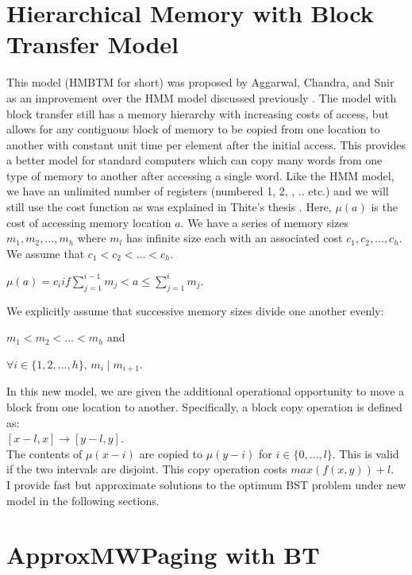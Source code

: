 \documentclass[letterpaper,12pt,titlepage,oneside,final]{book}
\theoremstyle{plain}
\begin{document}
\section{Hierarchical Memory with Block Transfer Model}
This model (HMBTM for short) was proposed by Aggarwal, Chandra, and Snir as an improvement over the HMM model \cite{aggarwal1987model} discussed previously \cite{aggarwal1987hierarchical}. The model with block transfer still has a memory hierarchy with increasing costs of access, but allows for any contiguous block of memory to be copied from one location to another with constant unit time per element after the initial access. This provides a better model for standard computers which can copy many words from one type of memory to another after accessing a single word. Like the HMM model, we have an unlimited number of registers (numbered 1, 2, , .. etc.) and we will still use the cost function as was explained in Thite's thesis \cite{thite2008optimum}. Here, $\mu (a)$ is the cost of accessing memory location $a$. We have a series of memory sizes $m_1, m_2, ..., m_h$ where $m_l$ has infinite size each with an associated cost $c_1, c_2, ..., c_h$. We assume that $c_1 < c_2 < ... < c_h$. 

\begin{center}$\mu (a) = c_i if \sum_{j = 1}^{i-1}m_j  < a \leq \sum_{j = 1}^{i}m_j$. \end{center}

We explicitly assume that successive memory sizes divide one another evenly:
\begin{center}
$m_1 < m_2 < ... < m_h$ and
\end{center}
\begin{center}
$\forall i \in  \{1,2,...,h\}$, $m_i \mid m_{i+1}$.
\end{center}

In this new model, we are given the additional operational opportunity to move a block from one location to another. Specifically, a block copy operation is defined as: \\
 $[x-l, x] \rightarrow [y-l,y]$. \\
The contents of $\mu(x-i)$ are copied to $\mu(y-i)$ for $i \in \{0,...,l\}$. This is valid if the two intervals are disjoint. This copy operation costs $max(f(x,y)) + l$.\\

I provide fast but approximate solutions to the optimum BST problem under new model in the following sections.

\section{ApproxMWPaging with BT}
\end{document}
